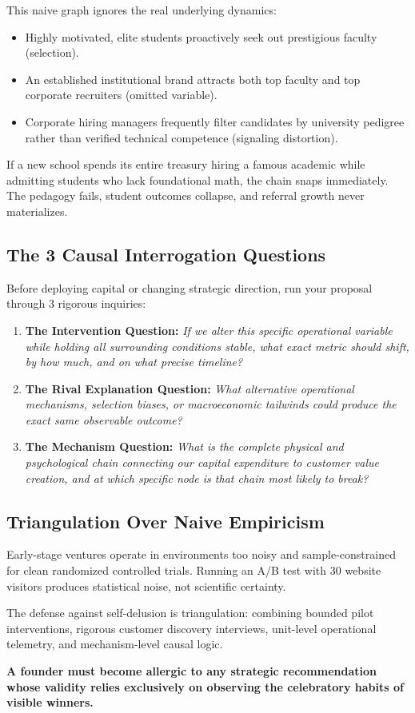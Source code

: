 This naive graph ignores the real underlying dynamics:
\begin{itemize}[leftmargin=10pt,itemsep=1pt,topsep=1pt]
  \item Highly motivated, elite students proactively seek out prestigious faculty (selection).
  \item An established institutional brand attracts both top faculty and top corporate recruiters (omitted variable).
  \item Corporate hiring managers frequently filter candidates by university pedigree rather than verified technical competence (signaling distortion).
\end{itemize}

If a new school spends its entire treasury hiring a famous academic while admitting students who lack foundational math, the chain snaps immediately. The pedagogy fails, student outcomes collapse, and referral growth never materializes.

\subsection{The 3 Causal Interrogation Questions}

Before deploying capital or changing strategic direction, run your proposal through 3 rigorous inquiries:

\begin{enumerate}[leftmargin=12pt,itemsep=2pt,topsep=1pt,parsep=0pt]
  \item \textbf{The Intervention Question:} \textit{If we alter this specific operational variable while holding all surrounding conditions stable, what exact metric should shift, by how much, and on what precise timeline?}
  \item \textbf{The Rival Explanation Question:} \textit{What alternative operational mechanisms, selection biases, or macroeconomic tailwinds could produce the exact same observable outcome?}
  \item \textbf{The Mechanism Question:} \textit{What is the complete physical and psychological chain connecting our capital expenditure to customer value creation, and at which specific node is that chain most likely to break?}
\end{enumerate}

\subsection{Triangulation Over Naive Empiricism}

Early-stage ventures operate in environments too noisy and sample-constrained for clean randomized controlled trials. Running an A/B test with 30 website visitors produces statistical noise, not scientific certainty.

The defense against self-delusion is triangulation: combining bounded pilot interventions, rigorous customer discovery interviews, unit-level operational telemetry, and mechanism-level causal logic.

\textbf{A founder must become allergic to any strategic recommendation whose validity relies exclusively on observing the celebratory habits of visible winners.}
